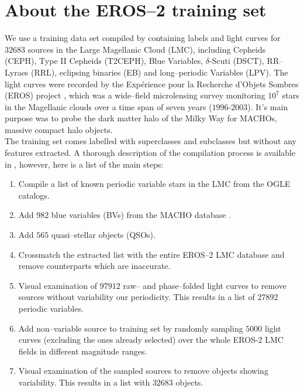 \section{About the EROS--2 training set}

We use a training data set compiled by \citet{kim2014} containing labels and light curves for $32683$ sources in the Large Magellanic Cloud (LMC), including Cepheids (CEPH), Type II Cepheids (T2CEPH), Blue Variables, $\delta$-Scuti (DSCT), RR--Lyraes (RRL), eclipsing binaries (EB) and long--periodic Variables (LPV). The light curves were recorded by the Expérience pour la Recherche d’Objets Sombres (EROS) project \citep{tisserand2007}, which was a wide--field microlensing survey monitoring $10^7$ stars in the Magellanic clouds over a time span of seven years ($1996$-$2003$). It's main purpose was to probe the dark matter halo of the Milky Way for MACHOs, massive compact halo objects.\\


The training set comes labelled with superclasses and subclasses but without any features extracted. A thorough description of the compilation process is available in \citet{kim2014}, however, here is a list of the main steps:

\begin{enumerate}
\item Compile a list of known periodic variable stars in the LMC from the OGLE \citep{udalski2008, soszy2008} catalogs.
\item Add $982$ blue variables (BVs) from the MACHO database \citep{keller2002}.
\item Add $565$ quasi--stellar objects (QSOs).
\item Crossmatch the extracted list with the entire EROS--2 LMC database and remove counterparts which are inaccurate.
\item Visual examination of $97912$ raw-- and phase--folded light curves to remove sources without variability our periodicity. This results in a list of 27892 periodic variables.
\item Add non--variable source to training set by randomly sampling $5000$ light curves (excluding the ones already selected) over the whole EROS-2 LMC fields in different magnitude ranges.
\item Visual examination of the sampled sources to remove objects showing variability. This results in a list with $32683$ objects.
\end{enumerate}

